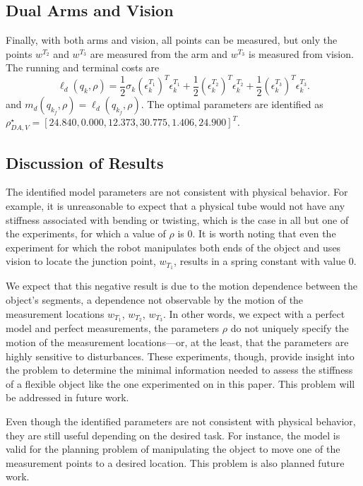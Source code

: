 \documentclass[runningheads,a4paper]{llncs}
\begin{document}
\subsection{Dual Arms and Vision \label{sec-2_vis}}
Finally, with both arms and vision, all points can be measured, but only the points $w^{T_2}$ and $w^{T_3}$ are measured from the arm and $w^{T_3}$ is measured from vision. The running and terminal costs are
\[
\ell_d(q_k,\rho) = \frac{1}{2} \sigma_k(\epsilon^{T_1}_k)^T\epsilon^{T_1}_k + \frac{1}{2} (\epsilon^{T_2}_k)^T\epsilon^{T_2}_k +\frac{1}{2} (\epsilon^{T_3}_k)^T\epsilon^{T_3}_k.
\]
and $m_d(q_{k_f},\rho) = \ell_d(q_{k_f},\rho)$. The optimal parameters are identified as $\rho^\star_{DA,V} = [24.840,  0.000, 12.373, 30.775,  1.406,  24.900]^T$.

\subsection{Discussion of Results}
The identified model parameters are not consistent with physical behavior. For example, it is unreasonable to expect that a physical tube would not have any stiffness associated with bending or twisting, which is the case in all but one of the experiments, for which a value of $\rho$ is 0. It is worth noting that even the experiment for which the robot manipulates both ends of the object and uses vision to locate the junction point, $w_{T_1}$, results in a spring constant with value 0. 

We expect that this negative result is due to the motion dependence between the object's segments, a dependence not observable by the motion of the measurement locations $w_{T_1}$, $w_{T_2}$, $w_{T_3}$.  In other words, we expect with a perfect model and perfect measurements, the parameters $\rho$ do not uniquely specify the motion of the measurement locations---or, at the least, that the parameters are highly sensitive to disturbances. These experiments, though, provide insight into the problem to determine the minimal information needed to assess the stiffness of a flexible object like the one experimented on in this paper.  This problem will be addressed in future work.

Even though the identified parameters are not consistent with physical behavior, they are still useful depending on the desired task. For instance, the model is valid for the planning problem of manipulating the object to move one of the measurement points to a desired location.  This problem is also planned future work.
\end{document}
